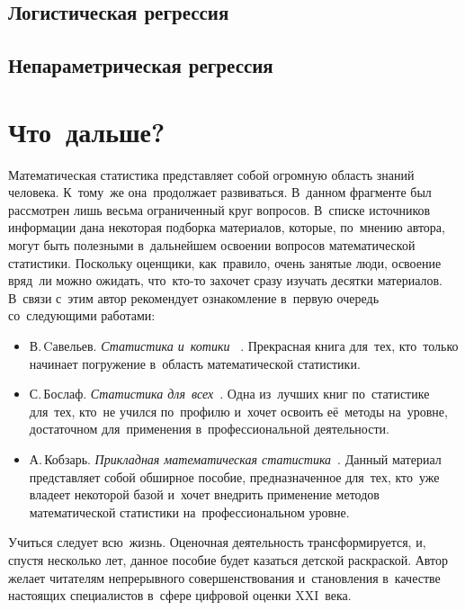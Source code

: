 \documentclass[]{scrartcl}
\begin{document}
\subsection{Логистическая регрессия}

\subsection{Непараметрическая регрессия}







\section{Что~дальше?}
Математическая статистика представляет собой огромную область знаний человека. К~тому~же она~продолжает развиваться. В~данном фрагменте был рассмотрен лишь весьма ограниченный круг вопросов. В~списке источников информации дана некоторая подборка материалов, которые, по~мнению автора, могут быть полезными в~дальнейшем освоении вопросов математической статистики. Поскольку оценщики, как~правило, очень занятые люди, освоение вряд~ли можно ожидать, что~кто-то захочет сразу изучать десятки материалов. В~связи с~этим автор рекомендует ознакомление в~первую очередь со~следующими работами:
	\begin{itemize}
		\item В.\,Cавельев. \emph{Статистика и~котики} ~\cite{Statistika-i-kotiki}. Прекрасная книга для~тех, кто~только начинает погружение в~область математической статистики.
		\item С.\,Бослаф. \emph{Статистика для~всех}~\cite{Statistika-dlya-vsex}. Одна из~лучших книг по~статистике для~тех, кто~не учился по~профилю и~хочет освоить её~методы на~уровне, достаточном для~применения в~профессиональной деятельности.
		\item А.\,Кобзарь. \emph{Прикладная математическая статистика}~\cite{Kobzarq-prikl-mathstat}. Данный материал представляет собой обширное пособие, предназначенное для~тех, кто~уже владеет некоторой базой и~хочет внедрить применение методов математической статистики на~профессиональном уровне.     
	\end{itemize}  

Учиться следует всю~жизнь. Оценочная деятельность трансформируется, и, спустя несколько лет, данное пособие будет казаться детской раскраской. Автор желает читателям непрерывного совершенствования и~становления в~качестве настоящих специалистов в~сфере цифровой оценки XXI~века.
\end{document}
